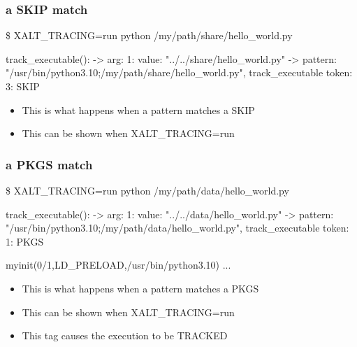 \documentclass{beamer}
\begin{document}
\begin{frame}[fragile]
    \frametitle{a SKIP match}
 {\tiny
    \begin{semiverbatim}
\$ XALT\_TRACING=run python /my/path/share/hello\_world.py

    track_executable():
    -> arg: 1: value: "../../share/hello\_world.py"
    -> pattern: "/usr/bin/python3.10;/my/path/share/hello\_world.py",
       track_executable token: 3: SKIP
    \end{semiverbatim}
}
  \begin{itemize}
    \item This is what happens when a pattern matches a SKIP
    \item This can be shown when XALT\_TRACING=run
  \end{itemize}

\end{frame}

\begin{frame}[fragile]
    \frametitle{a PKGS match}
 {\tiny
    \begin{semiverbatim}
\$ XALT\_TRACING=run python /my/path/data/hello_world.py

    track\_executable():
    -> arg: 1: value: "../../data/hello\_world.py"
    -> pattern: "/usr/bin/python3.10;/my/path/data/hello\_world.py",
    track_executable token: 1: PKGS

myinit(0/1,LD\_PRELOAD,/usr/bin/python3.10){
...
}
    \end{semiverbatim}
}
  \begin{itemize}
    \item This is what happens when a pattern matches a PKGS
    \item This can be shown when XALT\_TRACING=run
    \item This tag causes the execution to be TRACKED
  \end{itemize}

\end{frame}
\end{document}
